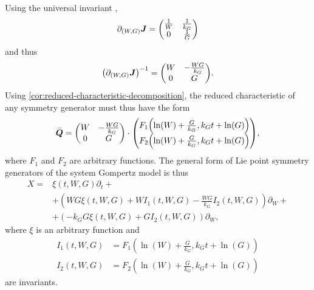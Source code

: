 Using the universal invariant ,
\begin{equation*}
  \partial_{(W, G)} \boldsymbol{J} =
  \begin{pmatrix}
    \frac{1}{W} & \frac{1}{k_G} \\
    0 & \frac{1}{G}
  \end{pmatrix}
\end{equation*}
and thus
\begin{equation*}
  \left(\partial_{(W, G)} \vect{J}\right)^{-1} =
  \begin{pmatrix}
    W & - \frac{W G}{k_G} \\
    0 & G
  \end{pmatrix}.
\end{equation*}
Using \cref{cor:reduced-characteristic-decomposition}, the reduced characteristic of any symmetry generator must thus have the form
\begin{equation} \label{eq:general-system-gompertz-characteristic}
  \bar{\vect{Q}} =
  \begin{pmatrix}
    W & - \frac{W G}{k_G} \\
    0 & G
  \end{pmatrix}
  \cdot
  \begin{pmatrix}
    F_1\left(\ln\left(W\right) + \frac{G}{k_G}, k_G t + \ln\left(G\right)\right) \\
    F_2\left(\ln\left(W\right) + \frac{G}{k_G}, k_G t + \ln\left(G\right)\right)
  \end{pmatrix},
\end{equation}
where \(F_1\) and \(F_2\) are arbitrary functions.
The general form of Lie point symmetry generators of the system Gompertz model is thus
\begin{align*}
  X =& \xi(t, W, G) \partial_t + \\
  &+ \left(W G \xi(t, W, G) + W I_1(t, W, G) - \frac{W G}{k_G} I_2(t, W, G)\right) \partial_W + \\
  &+ \left(-k_G G \xi(t, W, G) + G I_2(t, W, G)\right) \partial_W,
\end{align*}
where \(\xi\) is an arbitrary function and
\begin{align*}
  I_1(t, W, G) &= F_1\left(\ln\left(W\right) + \frac{G}{k_G}, k_G t + \ln\left(G\right)\right) \\
  I_2(t, W, G) &= F_2\left(\ln\left(W\right) + \frac{G}{k_G}, k_G t + \ln\left(G\right)\right)
\end{align*}
are invariants.


